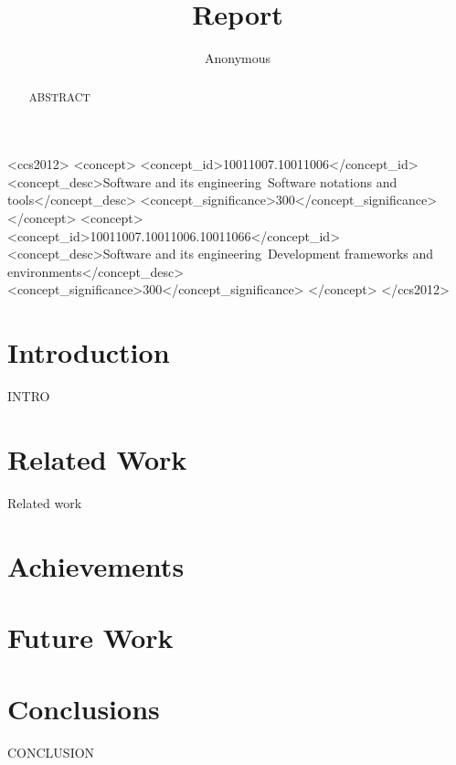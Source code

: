 \documentclass[sigconf]{acmart}
\begin{document}
\title{Report}

\author{Anonymous}

\newcommand\FIXME[1]{{\color{red}\textbf{FIXME: #1}}}

\begin{abstract}
ABSTRACT
 
\end{abstract}

%
%
\begin{CCSXML}
<ccs2012>
<concept>
<concept_id>10011007.10011006</concept_id>
<concept_desc>Software and its engineering~Software notations and tools</concept_desc>
<concept_significance>300</concept_significance>
</concept>
<concept>
<concept_id>10011007.10011006.10011066</concept_id>
<concept_desc>Software and its engineering~Development frameworks and environments</concept_desc>
<concept_significance>300</concept_significance>
</concept>
</ccs2012>
\end{CCSXML}





\maketitle

\section{Introduction}


INTRO

\section{Related Work}
Related work

\section{Achievements} 


\section{Future Work} 


\section{Conclusions} 
CONCLUSION

 
\end{document}
